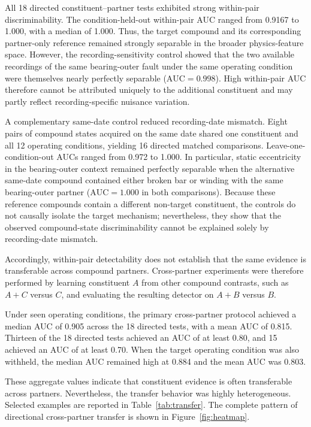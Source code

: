 All 18 directed constituent--partner tests exhibited strong within-pair
discriminability. The condition-held-out within-pair AUC ranged from 0.9167
to 1.000, with a median of 1.000. Thus, the target compound and its
corresponding partner-only reference remained strongly separable in the
broader physics-feature space. However, the recording-sensitivity control
showed that the two available recordings of the same bearing-outer fault
under the same operating condition were themselves nearly perfectly
separable ($\mathrm{AUC} = 0.998$). High within-pair AUC therefore cannot
be attributed uniquely to the additional constituent and may partly reflect
recording-specific nuisance variation.

A complementary same-date control reduced recording-date mismatch. Eight
pairs of compound states acquired on the same date shared one constituent
and all 12 operating conditions, yielding 16 directed matched comparisons.
Leave-one-condition-out AUCs ranged from 0.972 to 1.000. In particular,
static eccentricity in the bearing-outer context remained perfectly
separable when the alternative same-date compound contained either broken
bar or winding with the same bearing-outer partner ($\mathrm{AUC} = 1.000$
in both comparisons). Because these reference compounds contain a different
non-target constituent, the controls do not causally isolate the target
mechanism; nevertheless, they show that the observed compound-state
discriminability cannot be explained solely by recording-date mismatch.

Accordingly, within-pair detectability does not establish that the same
evidence is transferable across compound partners. Cross-partner
experiments were therefore performed by learning constituent $A$ from other
compound contrasts, such as $A{+}C$ versus $C$, and evaluating the
resulting detector on $A{+}B$ versus $B$.

Under seen operating conditions, the primary cross-partner protocol
achieved a median AUC of 0.905 across the 18 directed tests, with a mean
AUC of 0.815. Thirteen of the 18 directed tests achieved an AUC of at least
0.80, and 15 achieved an AUC of at least 0.70. When the target operating
condition was also withheld, the median AUC remained high at 0.884 and the
mean AUC was 0.803.

These aggregate values indicate that constituent evidence is often
transferable across partners. Nevertheless, the transfer behavior was
highly heterogeneous. Selected examples are reported in
Table~\ref{tab:transfer}. The complete pattern of directional cross-partner
transfer is shown in Figure~\ref{fig:heatmap}.

